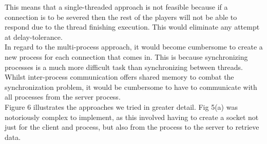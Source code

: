 \documentclass[11pt]{article}
\begin{document}
This means that a single-threaded approach is not feasible because if a connection is to be severed then the rest of the players will not be able to respond due to the thread finishing execution. This would eliminate any attempt at delay-tolerance. \\

In regard to the multi-process approach, it would become cumbersome to create a new process for each connection that comes in. This is because synchronizing processes is a much more difficult task than synchronizing between threads. Whilst inter-process communication offers shared memory \citep{shared_memory} to combat the synchronization problem, it would be cumbersome to have to communicate with all processes from the server process.\\
\newpage
Figure 6 illustrates the approaches we tried in greater detail. Fig 5(a) was notoriously complex to implement, as this involved having to create a socket not just for the client and process, but also from the process to the server to retrieve data. \\
\end{document}
